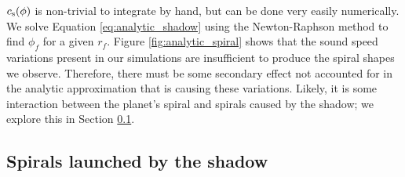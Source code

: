 \documentclass[twocolumn]{aastex631}
\begin{document}
$c_{\rm s}(\phi)$ is non-trivial to integrate by hand, but can be done very easily numerically. We solve Equation \ref{eq:analytic_shadow}
using the Newton-Raphson method to find $\phi_f$ for a given $r_f$. Figure \ref{fig:analytic_spiral} shows that the sound speed variations
present in our simulations are insufficient to produce the spiral shapes we observe. Therefore, there must be some secondary effect not accounted for
in the analytic approximation that is causing these variations. Likely, it is some interaction between the planet's spiral and spirals caused by the
shadow; we explore this in Section \ref{subsec:spiral_shadow}.

\subsection{Spirals launched by the shadow}
\label{subsec:spiral_shadow}









\end{document}
